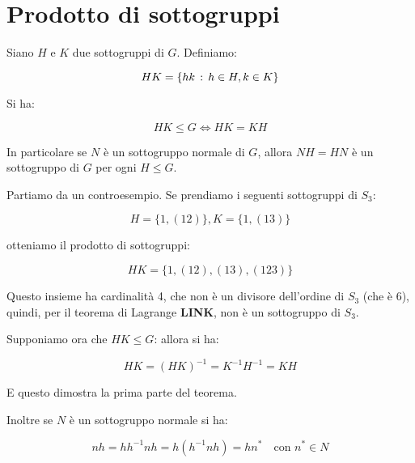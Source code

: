 \section{Prodotto di sottogruppi}

\begin{teorema}
	\label{thr:prodotto_sottogruppi}
	Siano $H$ e $K$ due sottogruppi di $G$. Definiamo:
	
	\begin{equation}
		HK = \{hk \,:\, h \in H, k \in K\}
	\end{equation}

	Si ha:

	\begin{equation}
		HK \le G \Longleftrightarrow HK = KH
	\end{equation}

	In particolare se $N$ è un sottogruppo normale di $G$, allora $NH = HN$ è un sottogruppo di $G$ per ogni $H \le G$.

\end{teorema}
\begin{dimostrazione}
	Partiamo da un controesempio. Se prendiamo i seguenti sottogruppi di $S_3$:
	
	\begin{equation}
		H = \{1, (12)\}, K = \{1, (13)\}
	\end{equation}
	
	otteniamo il prodotto di sottogruppi:
	
	\begin{equation}
		HK = \{1, (12), (13), (123)\}
	\end{equation}
	
	Questo insieme ha cardinalità 4, che non è un divisore dell'ordine di $S_3$ (che è 6), quindi, per il  teorema di Lagrange \textbf{LINK}, non è un sottogruppo di $S_3$.
	
	Supponiamo ora che $HK \le G$: allora si ha:
	
	\begin{equation}
		HK = (HK)^{-1} = K^{-1}H^{-1} = KH
	\end{equation}
	
	E questo dimostra la prima parte del teorema.
	
	Inoltre se $N$ è un sottogruppo normale si ha:
	
	\begin{equation}
		nh = hh^{-1}nh = h(h^{-1}nh) = hn^* \quad \text{con } n^* \in N
	\end{equation}
\end{dimostrazione}

